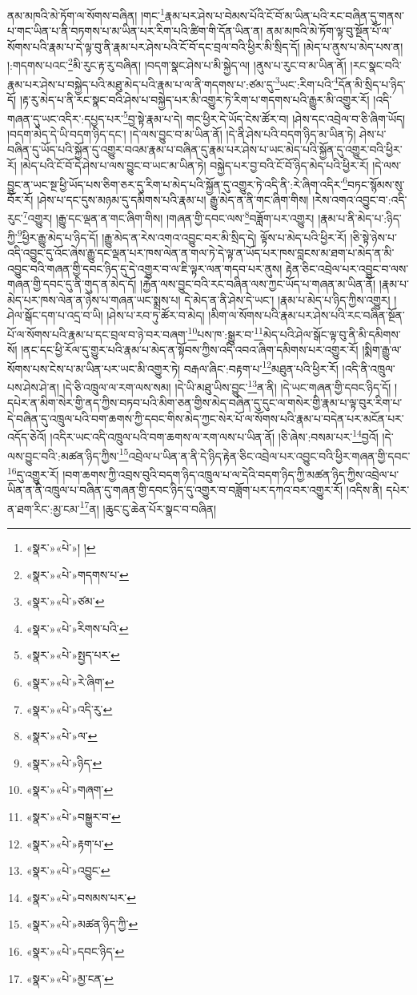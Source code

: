 ནམ་མཁའི་མེ་ཏོག་ལ་སོགས་བཞིན། །གང་\footnote{«སྣར་»«པེ་»། །}རྣམ་པར་ཤེས་པ་བེམས་པོའི་ངོ་བོ་མ་ཡིན་པའི་རང་བཞིན་དུ་གནས་པ་གང་ཡིན་པ་ནི་བཏགས་པ་མ་ཡིན་པར་རིག་པའི་ཚིག་གི་དོན་ཡིན་ན། ནམ་མཁའི་མེ་ཏོག་ལྟ་བུ་སྔོན་པོ་ལ་སོགས་པའི་རྣམ་པ་དེ་ལྟ་བུ་ནི་རྣམ་པར་ཤེས་པའི་ངོ་བོ་དང་བྲལ་བའི་ཕྱིར་མི་སྲིད་དོ། །མེད་པ་ནུས་པ་མེད་པས་ན། །:གདགས་པའང་\footnote{«སྣར་»«པེ་»གདགས་པ་}མི་རུང་རྟ་རུ་བཞིན། །བདག་སྣང་ཤེས་པ་མི་སྐྱེད་ལ། །ནུས་པ་རུང་བ་མ་ཡིན་ནོ། །རང་སྣང་བའི་རྣམ་པར་ཤེས་པ་བསྐྱེད་པའི་མཐུ་མེད་པའི་རྣམ་པ་ལ་ནི་གདགས་པ་:ཙམ་དུ་\footnote{«སྣར་»«པེ་»ཙམ་}ཡང་:རིག་པའི་\footnote{«སྣར་»«པེ་»རིགས་པའི་}དོན་མི་སྲིད་པ་ཉིད་དོ། །རྟ་རུ་མེད་པ་ནི་རང་སྣང་བའི་ཤེས་པ་བསྐྱེད་པར་མི་འགྱུར་ཏེ་རིག་པ་གདགས་པའི་རྒྱུར་མི་འགྱུར་རོ། །འདི་གཞན་དུ་ཡང་འདིར་:དཔྱད་པར་\footnote{«སྣར་»«པེ་»སྤྱད་པར་}བྱ་སྟེ་རྣམ་པ་དེ། གང་ཕྱིར་དེ་ཡོད་ངེས་ཚོར་བ། །ཤེས་དང་འབྲེལ་བ་ཅི་ཞིག་ཡོད། །བདག་མེད་དེ་ཡི་བདག་ཉིད་དང་། །དེ་ལས་བྱུང་བ་མ་ཡིན་ནོ། །དེ་ནི་ཤེས་པའི་བདག་ཉིད་མ་ཡིན་ཏེ། ཤེས་པ་བཞིན་དུ་ཡོད་པའི་སྐྱོན་དུ་འགྱུར་བའམ་རྣམ་པ་བཞིན་དུ་རྣམ་པར་ཤེས་པ་ཡང་མེད་པའི་སྐྱོན་དུ་འགྱུར་བའི་ཕྱིར་རོ། །མེད་པའི་ངོ་བོ་དེ་ཤེས་པ་ལས་བྱུང་བ་ཡང་མ་ཡིན་ཏེ། བསྐྱེད་པར་བྱ་བའི་ངོ་བོ་ཉིད་མེད་པའི་ཕྱིར་རོ། །དེ་ལས་བྱུང་ན་ཡང་སྔ་ཕྱི་ཡོད་པས་ཅིག་ཅར་དུ་རིག་པ་མེད་པའི་སྐྱོན་དུ་འགྱུར་ཏེ་འདི་ནི་:རེ་ཞིག་འདིར་\footnote{«སྣར་»«པེ་»རེ་ཞིག་}བཏང་སྙོམས་སུ་བོར་རོ། །ཤེས་པ་དང་དུས་མཉམ་དུ་དམིགས་པའི་རྣམ་པ། རྒྱུ་མེད་ན་ནི་གང་ཞིག་གིས། །རེས་འགའ་འབྱུང་བ་:འདི་རུང་\footnote{«སྣར་»«པེ་»འདི་རུ་}འགྱུར། །རྒྱུ་དང་ལྡན་ན་གང་ཞིག་གིས། །གཞན་གྱི་དབང་ལས་\footnote{«སྣར་»«པེ་»ལ་}བཟློག་པར་འགྱུར། །རྣམ་པ་ནི་མེད་པ་:ཉིད་ཀྱི་\footnote{«སྣར་»«པེ་»ཉིད་}ཕྱིར་རྒྱུ་མེད་པ་ཉིད་དོ། །རྒྱུ་མེད་ན་རེས་འགའ་འབྱུང་བར་མི་སྲིད་དེ། ལྟོས་པ་མེད་པའི་ཕྱིར་རོ། །ཅི་སྟེ་ཉེས་པ་འདི་འབྱུང་དུ་འོང་ཞེས་རྒྱུ་དང་ལྡན་པར་ཁས་ལེན་ན་གལ་ཏེ་དེ་ལྟ་ན་ཡོད་པར་ཁས་བླངས་མ་ཐག་པ་མེད་ན་མི་འབྱུང་བའི་གཞན་གྱི་དབང་ཉིད་དུ་དེ་འགྱུར་བ་ལ་ཇི་ལྟར་ལན་གདབ་པར་ནུས། རྟེན་ཅིང་འབྲེལ་པར་འབྱུང་བ་ལས་གཞན་གྱི་དབང་དུ་ནི་གུད་ན་མེད་དོ། །རྐྱེན་ལས་བྱུང་བའི་རང་བཞིན་ལས་ཀྱང་ཡོད་པ་གཞན་མ་ཡིན་ནོ། །རྣམ་པ་མེད་པར་ཁས་ལེན་ན་ཉེས་པ་གཞན་ཡང་སྨྲས་པ། དེ་མེད་ན་ནི་ཤེས་དེ་ཡང་། །རྣམ་པ་མེད་པ་ཉིད་ཀྱིས་འགྱུར། །ཤེལ་སྒོང་དག་པ་འདྲ་བ་ཡི། །ཤེས་པ་རབ་ཏུ་ཚོར་བ་མེད། །མིག་ལ་སོགས་པའི་རྣམ་པར་ཤེས་པའི་རང་བཞིན་སྔོན་པོ་ལ་སོགས་པའི་རྣམ་པ་དང་བྲལ་བ་ཉེ་བར་བཞག་\footnote{«སྣར་»«པེ་»གཞག་}པས་ཁ་:སྒྱུར་བ་\footnote{«སྣར་»«པེ་»བསྒྱུར་བ་}མེད་པའི་ཤེལ་སྒོང་ལྟ་བུ་ནི་མི་དམིགས་སོ། །ནང་དང་ཕྱི་རོལ་དུ་གྱུར་པའི་རྣམ་པ་མེད་ན་སྟོབས་ཀྱིས་འདི་འབའ་ཞིག་དམིགས་པར་འགྱུར་རོ། །སྨིག་རྒྱུ་ལ་སོགས་པས་ངེས་པ་མ་ཡིན་པར་ཡང་མི་འགྱུར་ཏེ། བརྒལ་ཞིང་:བརྟག་པ་\footnote{«སྣར་»«པེ་»རྟག་པ་}མཐུན་པའི་ཕྱིར་རོ། །འདི་ནི་འཁྲུལ་པས་ཤེས་ཤེ་ན། །དེ་ཅི་འཁྲུལ་ལ་རག་ལས་སམ། །དེ་ཡི་མཐུ་ཡིས་བྱུང་\footnote{«སྣར་»«པེ་»འབྱུང་}ན་ནི། །དེ་ཡང་གཞན་གྱི་དབང་ཉིད་དོ། །དཔེར་ན་མིག་སེར་གྱི་ནད་ཀྱིས་བཏབ་པའི་མིག་ཅན་གྱིས་མེད་བཞིན་དུ་དུང་ལ་གསེར་གྱི་རྣམ་པ་ལྟ་བུར་རིག་པ་དེ་བཞིན་དུ་འཁྲུལ་པའི་བག་ཆགས་ཀྱི་དབང་གིས་མེད་ཀྱང་སེར་པོ་ལ་སོགས་པའི་རྣམ་པ་བདེན་པར་མངོན་པར་འདོད་ཅེའོ། །འདིར་ཡང་འདི་འཁྲུལ་པའི་བག་ཆགས་ལ་རག་ལས་པ་ཡིན་ནོ། །ཅི་ཞེས་:བསམ་པར་\footnote{«སྣར་»«པེ་»བསམས་པར་}བྱའོ། །དེ་ལས་བྱུང་བའི་:མཚན་ཉིད་ཀྱིས་\footnote{«སྣར་»«པེ་»མཚན་ཉིད་ཀྱི་}འབྲེལ་པ་ཡིན་ན་ནི་དེ་ཉིད་རྟེན་ཅིང་འབྲེལ་པར་འབྱུང་བའི་ཕྱིར་གཞན་གྱི་དབང་\footnote{«སྣར་»«པེ་»དབང་ཉིད་}དུ་འགྱུར་རོ། །བག་ཆགས་ཀྱི་འབྲས་བུའི་བདག་ཉིད་འཁྲུལ་པ་ལ་དེའི་བདག་ཉིད་ཀྱི་མཚན་ཉིད་ཀྱིས་འབྲེལ་པ་ཡིན་ན་ནི་འཁྲུལ་པ་བཞིན་དུ་གཞན་གྱི་དབང་ཉིད་དུ་འགྱུར་བ་བཟློག་པར་དཀའ་བར་འགྱུར་རོ། །འདིས་ནི། དཔེར་ན་ཐག་རིང་:མྱ་ངམ་\footnote{«སྣར་»«པེ་»མྱ་ངན་}ན། །ཆུང་ངུ་ཆེན་པོར་སྣང་བ་བཞིན། 
